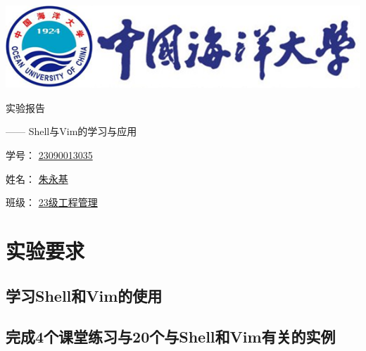 \documentclass[UTF8,a4paper]{ctexart}
\begin{document}
\begin{sloppypar}


	\begin{center}
	\includegraphics[width = 14cm]{picture/s1}

		\begin{fontsize}{60pt}{20pt}
			实验报告
		\end{fontsize}

		\bigskip
		\bigskip
		
		\begin{fontsize}{20pt}{20pt}
			\begin{flushright}
				—— {\Huge Shell}与{\Huge Vim}的学习与应用
			\end{flushright}
		\end{fontsize}
		
		\bigskip
		\bigskip
		\bigskip
		\bigskip
		\bigskip
		\bigskip
		\bigskip
		\bigskip
		\bigskip
		\bigskip
		\bigskip
		\bigskip
		\bigskip
		\bigskip
		\bigskip
		\bigskip
		
		\begin{fontsize}{25pt}{20pt}

			学号：
			\underline{{\huge 23090013035}}
			\bigskip
			\bigskip
			\bigskip
			\bigskip

			姓名：
			\underline{朱永基}
			\bigskip
			\bigskip
			\bigskip
			\bigskip

			班级：
			\underline{{\Huge 23}级工程管理}
				
		\end{fontsize}
	\end{center}
	\section{实验要求}
	\subsection{学习Shell和Vim的使用}
	\subsection{完成4个课堂练习与20个与Shell和Vim有关的实例}

			\bigskip
			\bigskip
			\bigskip
			\bigskip


\end{sloppypar}
\end{document}
